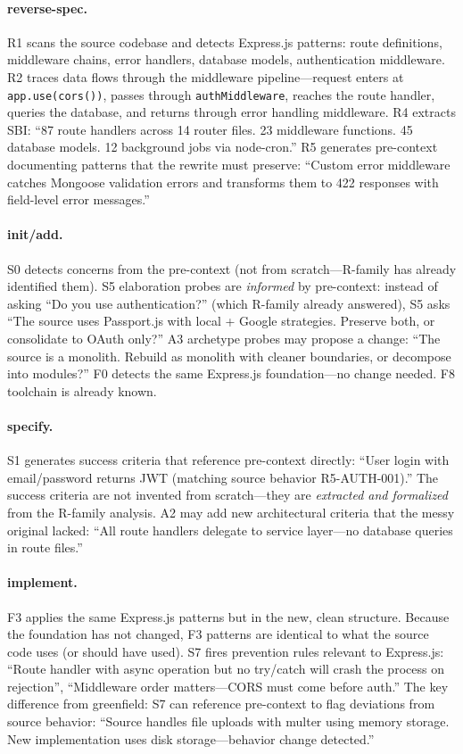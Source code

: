 \documentclass[11pt,a4paper,openright,twoside]{report}
\begin{document}
\paragraph{reverse-spec.}
R1 scans the source codebase and detects Express.js patterns: route definitions, middleware chains, error handlers, database models, authentication middleware. R2 traces data flows through the middleware pipeline---request enters at \texttt{app.use(cors())}, passes through \texttt{authMiddleware}, reaches the route handler, queries the database, and returns through error handling middleware. R4 extracts SBI: ``87 route handlers across 14 router files. 23 middleware functions. 45 database models. 12 background jobs via node-cron.'' R5 generates pre-context documenting patterns that the rewrite must preserve: ``Custom error middleware catches Mongoose validation errors and transforms them to 422 responses with field-level error messages.''

\paragraph{init/add.}
S0 detects concerns from the pre-context (not from scratch---R-family has already identified them). S5 elaboration probes are \emph{informed} by pre-context: instead of asking ``Do you use authentication?'' (which R-family already answered), S5 asks ``The source uses Passport.js with local + Google strategies. Preserve both, or consolidate to OAuth only?'' A3 archetype probes may propose a change: ``The source is a monolith. Rebuild as monolith with cleaner boundaries, or decompose into modules?'' F0 detects the same Express.js foundation---no change needed. F8 toolchain is already known.

\paragraph{specify.}
S1 generates success criteria that reference pre-context directly: ``User login with email/password returns JWT (matching source behavior R5-AUTH-001).'' The success criteria are not invented from scratch---they are \emph{extracted and formalized} from the R-family analysis. A2 may add new architectural criteria that the messy original lacked: ``All route handlers delegate to service layer---no database queries in route files.''

\paragraph{implement.}
F3 applies the same Express.js patterns but in the new, clean structure. Because the foundation has not changed, F3 patterns are identical to what the source code uses (or should have used). S7 fires prevention rules relevant to Express.js: ``Route handler with async operation but no try/catch will crash the process on rejection'', ``Middleware order matters---CORS must come before auth.'' The key difference from greenfield: S7 can reference pre-context to flag deviations from source behavior: ``Source handles file uploads with multer using memory storage. New implementation uses disk storage---behavior change detected.''
\end{document}

